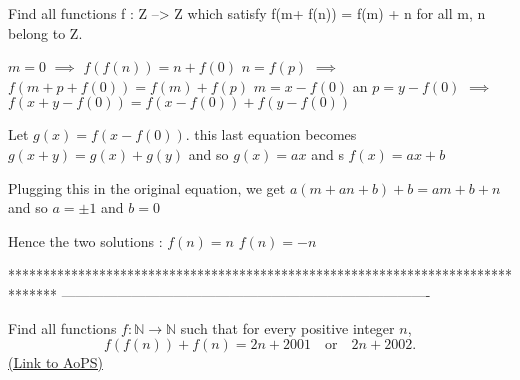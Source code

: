 \begin{solution}
	\begin{tcolorbox}Find all functions f : Z --> Z which satisfy f(m+ f(n)) = f(m) + n for all m, n belong to Z.\end{tcolorbox}

$ m=0$ $ \implies$ $ f(f(n))=n+f(0)$
$ n=f(p)$ $ \implies$ $ f(m+p+f(0))=f(m)+f(p)$
$ m=x-f(0)$ an $ p=y-f(0)$ $ \implies$ $ f(x+y-f(0))=f(x-f(0))+f(y-f(0))$

Let $ g(x)=f(x-f(0))$. this last equation becomes $ g(x+y)=g(x)+g(y)$ and so $ g(x)=ax$ and s $ f(x)=ax+b$

Plugging this in the original equation, we get $ a(m+an+b)+b=am+b+n$ and so $ a=\pm 1$ and $ b=0$

Hence the two solutions :
$ f(n)=n$
$ f(n)=-n$
\end{solution}
*******************************************************************************
-------------------------------------------------------------------------------

\begin{problem}
	Find all functions $f: \mathbb N \to \mathbb N$ such that for every positive integer $n$,
\[ f(f(n)) + f(n) = 2n+2001 \quad \text{or} \quad 2n + 2002.\]
	\flushright \href{https://artofproblemsolving.com/community/c6h316526}{(Link to AoPS)}
\end{problem}



